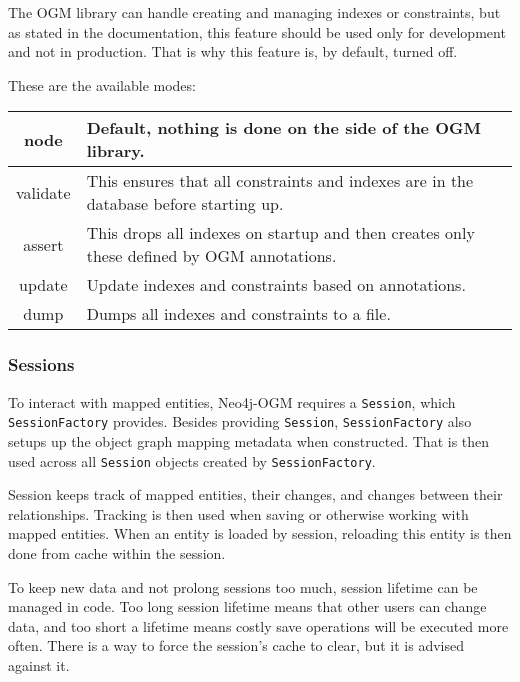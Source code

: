 \documentclass[thesis=M,english]{FITthesis}[2019/12/23]
\begin{document}
The OGM library can handle creating and managing indexes or constraints, but as stated in the documentation, this feature should be used only for development
and not in production. That is why this feature is, by default, turned off.


These are the available modes:
\begin{table}[H]
    \begin{center}
        \begin{tabularx}{\textwidth}{|c|p{}|}
            \hline
            node     & Default, nothing is done on the side of the OGM library.                                  \\
            \hline
            validate & This ensures that all constraints and indexes are in the database before starting up.     \\
            \hline
            assert   & This drops all indexes on startup and then creates only these defined by OGM annotations. \\
            \hline
            update   & Update indexes and constraints based on annotations.                                      \\
            \hline
            dump     & Dumps all indexes and constraints to a file.                                              \\
            \hline
        \end{tabularx}
    \end{center}
\end{table}

\subsubsection{Sessions}
To interact with mapped entities, Neo4j-OGM requires a \texttt{Session}, which \texttt{SessionFactory} provides. Besides providing \texttt{Session}, \texttt{SessionFactory} also setups up the object graph mapping metadata when constructed. That is then used across all \texttt{Session} objects created by \texttt{SessionFactory}.

Session keeps track of mapped entities, their changes, and changes between their relationships. Tracking is then used when saving or otherwise working with mapped entities. When an entity is loaded by session, reloading this entity is then done from cache within the session.

To keep new data and not prolong sessions too much, session lifetime can be managed in code. Too long session lifetime means that other users can change data, and too short a lifetime means costly save operations will be executed more often. There is a way to force the session's cache to clear, but it is advised against it.
\end{document}

